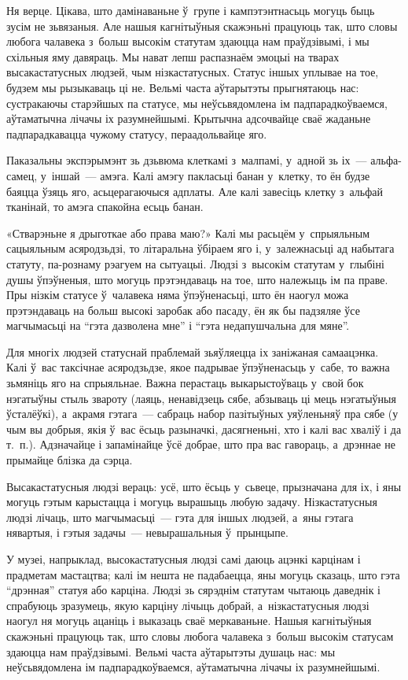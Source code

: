 Ня верце. Цікава, што дамінаваньне ў~групе і кампэтэнтнасьць могуць быць зусім не зьвязаныя. Але нашыя кагнітыўныя скажэньні працуюць так, што словы любога чалавека з~больш высокім статутам здаюцца нам праўдзівымі, і мы схільныя яму давяраць. Мы нават лепш распазнаём эмоцыі на тварах высакастатусных людзей, чым нізкастатусных. Статус іншых уплывае на тое, будзем мы рызыкаваць ці не. Вельмі часта аўтарытэты прыгнятаюць нас: сустракаючы старэйшых па статусе, мы неўсьвядомлена ім падпарадкоўваемся, аўтаматычна лічачы іх разумнейшымі. Крытычна адсочвайце сваё жаданьне падпарадкавацца чужому статусу, пераадольвайце яго.

Паказальны экспэрымэнт зь дзьвюма клеткамі з~малпамі, у~адной зь іх~--- альфа-самец, у~іншай~--- амэга. Калі амэгу пакласьці банан у~клетку, то ён будзе баяцца ўзяць яго, асьцерагаючыся адплаты. Але калі завесіць клетку з~альфай тканінай, то амэга спакойна есьць банан.

«Стварэньне я дрыготкае або права маю?» Калі мы расьцём у~спрыяльным сацыяльным асяродзьдзі, то літаральна ўбіраем яго і, у~залежнасьці ад набытага статуту, па-рознаму рэагуем на сытуацыі. Людзі з~высокім статутам у~глыбіні душы ўпэўненыя, што могуць прэтэндаваць на тое, што належыць ім па праве. Пры нізкім статусе ў~чалавека няма ўпэўненасьці, што ён наогул можа прэтэндаваць на больш высокі заробак або пасаду, ён як бы падзяляе ўсе магчымасьці на ``гэта дазволена мне'' і ``гэта недапушчальна для мяне''.

Для многіх людзей статуснай праблемай зьяўляецца іх заніжаная самаацэнка. Калі ў~вас таксічнае асяродзьдзе, якое падрывае ўпэўненасьць у~сабе, то важна зьмяніць яго на спрыяльнае. Важна перастаць выкарыстоўваць у~свой бок нэгатыўны стыль звароту (лаяць, ненавідзець сябе, абзываць ці мець нэгатыўныя ўсталёўкі), а~акрамя гэтага~--- сабраць набор пазітыўных уяўленьняў пра сябе (у чым вы добрыя, якія ў~вас ёсьць разыначкі, дасягненьні, хто і калі вас хваліў і да т.~п.). Адзначайце і запамінайце ўсё добрае, што пра вас гавораць, а~дрэннае не прымайце блізка да сэрца.

Высакастатусныя людзі вераць: усё, што ёсьць у~сьвеце, прызначана для іх, і яны могуць гэтым карыстацца і могуць вырашыць любую задачу. Нізкастатусныя людзі лічаць, што магчымасьці~--- гэта для іншых людзей, а~яны гэтага нявартыя, і гэтыя задачы~--- невырашальныя ў~прынцыпе.

У музеі, напрыклад, высокастатусныя людзі самі даюць ацэнкі карцінам і прадметам мастацтва; калі ім нешта не падабаецца, яны могуць сказаць, што гэта ``дрэнная'' статуя або карціна. Людзі зь сярэднім статутам чытаюць даведнік і спрабуюць зразумець, якую карціну лічыць добрай, а~нізкастатусныя людзі наогул ня могуць ацаніць і выказаць сваё меркаваньне. Нашыя кагнітыўныя скажэньні працуюць так, што словы любога чалавека з~больш высокім статусам здаюцца нам праўдзівымі. Вельмі часта аўтарытэты душаць нас: мы неўсьвядомлена ім падпарадкоўваемся, аўтаматычна лічачы іх разумнейшымі.

